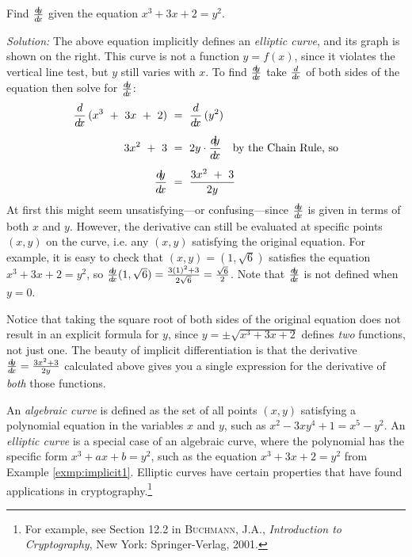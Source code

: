 \begin{exmp}\label{exmp:implicit1}
\parpic[r]{}
\noindent Find $\frac{d\negmedspace y}{d\!x}$ given the equation $x^3 + 3x + 2 = y^2$.\vspace{1mm}
\par\noindent\emph{Solution:} The above equation implicitly defines an
\emph{elliptic curve}, and its graph is shown on the
right. This curve is not a function $y=f(x)$, since it
violates the vertical line test, but $y$ still varies with $x$. To find
$\frac{d\negmedspace y}{d\!x}$ take $\frac{d}{d\!x}$ of both sides of the equation then solve for $\frac{d\negmedspace y}{d\!x}$:
\begin{align*}
\frac{d}{d\!x}\,(x^3 ~+~ 3x ~+~ 2) ~&=~ \frac{d}{d\!x}\,(y^2)\\[5pt]
3x^2 ~+~ 3 ~&=~ 2y \cdot \frac{d\negmedspace y}{d\!x} \quad\text{by the Chain Rule, so}\\[5pt]
\frac{d\negmedspace y}{d\!x} ~&=~ \frac{3x^2 ~+~ 3}{2y}
\end{align*}\vspace{-6mm}
At first this might seem unsatisfying---or confusing---since $\frac{d\negmedspace y}{d\!x}$ is given
in terms of both $x$ and $y$. However, the derivative can still
be evaluated at specific points $(x,y)$ on the curve, i.e. any $(x,y)$
satisfying the original equation. For example, it is easy to check that
$(x,y) = (1,\sqrt{6})$ satisfies the equation $x^3 + 3x + 2 = y^2$, so
$\frac{d\negmedspace y}{d\!x}(1,\sqrt{6}) = \frac{3(1)^2 + 3}{2\sqrt{6}} = \frac{\sqrt{6}}{2}$. Note
that $\frac{d\negmedspace y}{d\!x}$ is not defined when $y=0$.

Notice that taking the square root of both sides of the original equation does
not result in an explicit formula for $y$, since $y = \pm \sqrt{x^3 + 3x + 2}$
defines \emph{two} functions, not just one. The beauty of implicit
differentiation is that the derivative $\frac{d\negmedspace y}{d\!x} = \frac{3x^2 + 3}{2y}$ calculated
above gives you a single expression for the derivative of \emph{both} those
functions.
\end{exmp}
\divider
\newpage
An \emph{algebraic curve} is defined as the set of all
points $(x,y)$ satisfying a polynomial equation in the variables $x$ and $y$,
such as $x^2 - 3xy^4 + 1 = x^5 - y^2$. An \emph{elliptic curve} is a special
case of an algebraic curve, where the polynomial has the specific form
$x^3 + ax + b = y^2$, such as the equation $x^3 + 3x + 2 = y^2$ from Example
\ref{exmp:implicit1}. Elliptic curves have certain properties that have found
applications in cryptography.\footnote{For example, see Section 12.2 in
\textsc{Buchmann, J.A.}, \emph{Introduction to Cryptography}, New York:
Springer-Verlag, 2001.}

